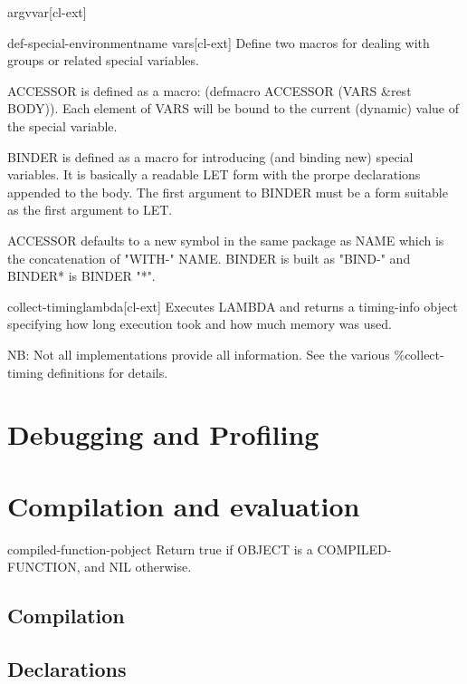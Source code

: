 \documentclass[10pt,english]{book}
\begin{document}
\begin{function}{argv}{var}[cl-ext]
  
\end{function}

\begin{macro}{def-special-environment}{name \key \rest vars}[cl-ext]
  Define two macros for dealing with groups or related special variables.

ACCESSOR is defined as a macro: (defmacro ACCESSOR (VARS \&rest
BODY)).  Each element of VARS will be bound to the
current (dynamic) value of the special variable.

BINDER is defined as a macro for introducing (and binding new)
special variables. It is basically a readable LET form with the
prorpe declarations appended to the body. The first argument to
BINDER must be a form suitable as the first argument to LET.

ACCESSOR defaults to a new symbol in the same package as NAME
which is the concatenation of "WITH-" NAME. BINDER is built as
"BIND-" and BINDER* is BINDER "*".
\end{macro}

\begin{function}{collect-timing}{lambda}[cl-ext]
  Executes LAMBDA and returns a timing-info object specifying
  how long execution took and how much memory was used.

NB: Not all implementations provide all information. See the
various \%collect-timing definitions for details.
\end{function}


\chapter{Debugging and Profiling}


\chapter{Compilation and evaluation}

\begin{function}{compiled-function-p}{object}
  Return true if OBJECT is a COMPILED-FUNCTION, and NIL otherwise.
\end{function}

\section{Compilation}

\section{Declarations}
\end{document}

